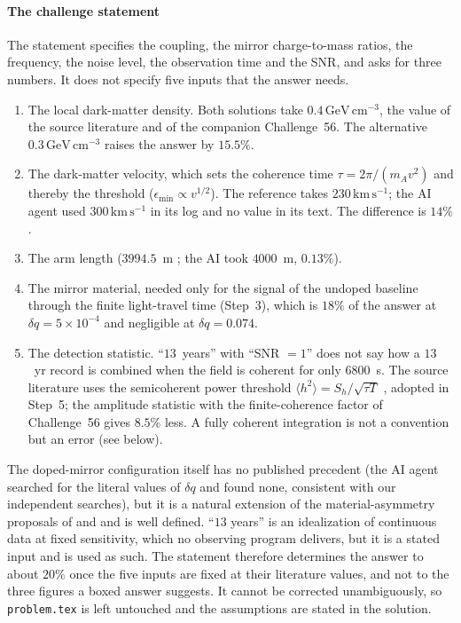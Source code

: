 \paragraph*{The challenge statement}
The statement specifies the coupling, the mirror charge-to-mass ratios, the frequency, the noise level, the observation time and the SNR, and asks for three numbers. It does not specify five inputs that the answer needs.
\begin{enumerate}[label=(\roman*),leftmargin=*]
\item The local dark-matter density. Both solutions take $0.4\,\mathrm{GeV\,cm^{-3}}$, the value of the source literature \citep{Pierce2018,Guo2019,Morisaki2021} and of the companion Challenge~56. The alternative $0.3\,\mathrm{GeV\,cm^{-3}}$ \citep{Baxter2021} raises the answer by $15.5\%$.
\item The dark-matter velocity, which sets the coherence time $\tau=2\pi/(m_Av^2)$ and thereby the threshold ($\epsilon_{\min}\propto v^{1/2}$). The reference takes $230\,\mathrm{km\,s^{-1}}$; the AI agent used $300\,\mathrm{km\,s^{-1}}$ in its log and no value in its text. The difference is $14\%$.
\item The arm length ($3994.5$~m \citep{Aasi2015}; the AI took $4000$~m, $0.13\%$).
\item The mirror material, needed only for the signal of the undoped baseline through the finite light-travel time (Step~3), which is $18\%$ of the answer at $\delta q=5\times10^{-4}$ and negligible at $\delta q=0.074$.
\item The detection statistic. ``$13$~years'' with ``SNR $=1$'' does not say how a $13$~yr record is combined when the field is coherent for only $6800$~s. The source literature uses the semicoherent power threshold $\langle h^2\rangle=S_h/\sqrt{\tau T}$ \citep{Pierce2018,Morisaki2021}, adopted in Step~5; the amplitude statistic with the finite-coherence factor of Challenge~56 gives $8.5\%$ less. A fully coherent integration is not a convention but an error (see below).
\end{enumerate}
The doped-mirror configuration itself has no published precedent (the AI agent searched for the literal values of $\delta q$ and found none, consistent with our independent searches), but it is a natural extension of the material-asymmetry proposals of \citet{Michimura2020} and \citet{Manley2021} and is well defined. ``$13$ years'' is an idealization of continuous data at fixed sensitivity, which no observing program delivers, but it is a stated input and is used as such. The statement therefore determines the answer to about $20\%$ once the five inputs are fixed at their literature values, and not to the three figures a boxed answer suggests. It cannot be corrected unambiguously, so \texttt{problem.tex} is left untouched and the assumptions are stated in the solution.

